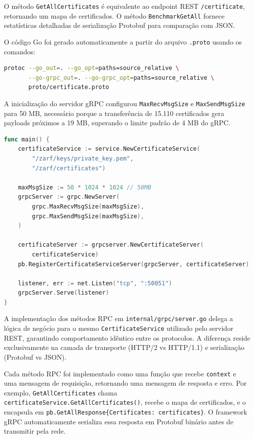 O método \texttt{GetAllCertificates} é equivalente ao endpoint REST \texttt{/certificate}, retornando um mapa de certificados. O método \texttt{BenchmarkGetAll} fornece estatísticas detalhadas de serialização Protobuf para comparação com JSON.

O código Go foi gerado automaticamente a partir do arquivo \texttt{.proto} usando os comandos:

\begin{lstlisting}[language=bash]
protoc --go_out=. --go_opt=paths=source_relative \
       --go-grpc_out=. --go-grpc_opt=paths=source_relative \
       proto/certificate.proto
\end{lstlisting}

A inicialização do servidor gRPC configurou \texttt{MaxRecvMsgSize} e \texttt{MaxSendMsgSize} para 50 MB, necessário porque a transferência de 15.110 certificados gera payloads próximos a 19 MB, superando o limite padrão de 4 MB do gRPC.

\begin{lstlisting}[language=Go, caption={Inicialização do servidor gRPC},label=lst:grpc-init]
func main() {
    certificateService := service.NewCertificateService(
        "/zarf/keys/private_key.pem",
        "/zarf/certificates")

    maxMsgSize := 50 * 1024 * 1024 // 50MB
    grpcServer := grpc.NewServer(
        grpc.MaxRecvMsgSize(maxMsgSize),
        grpc.MaxSendMsgSize(maxMsgSize),
    )

    certificateServer := grpcserver.NewCertificateServer(
        certificateService)
    pb.RegisterCertificateServiceServer(grpcServer, certificateServer)

    listener, err := net.Listen("tcp", ":50051")
    grpcServer.Serve(listener)
}
\end{lstlisting}

A implementação dos métodos RPC em \texttt{internal/grpc/server.go} delega a lógica de negócio para o mesmo \texttt{CertificateService} utilizado pelo servidor REST, garantindo comportamento idêntico entre os protocolos. A diferença reside exclusivamente na camada de transporte (HTTP/2 vs HTTP/1.1) e serialização (Protobuf vs JSON).

Cada método RPC foi implementado como uma função que recebe \texttt{context} e uma mensagem de requisição, retornando uma mensagem de resposta e erro. Por exemplo, \texttt{GetAllCertificates} chama \texttt{certificateService.GetAllCertificates()}, recebe o mapa de certificados, e o encapsula em \texttt{pb.GetAllResponse\{Certificates: certificates\}}. O framework gRPC automaticamente serializa essa resposta em Protobuf binário antes de transmitir pela rede.

